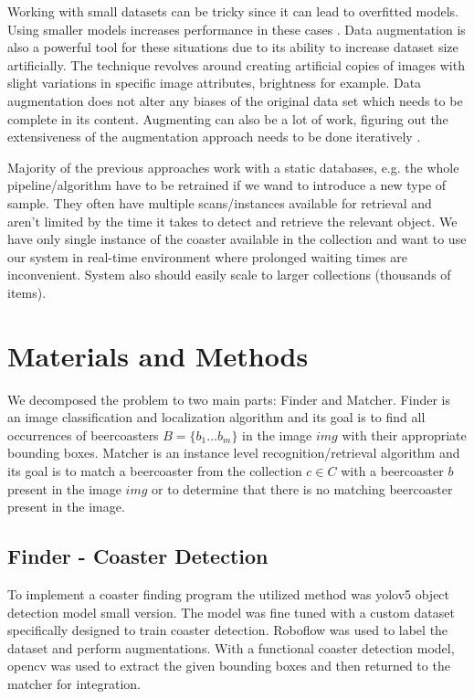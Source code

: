 \documentclass{article}
\begin{document}
Working with small datasets can be tricky since it can lead to overfitted models. Using smaller models increases performance in these cases \cite{augmentation2}. Data augmentation is also a powerful tool for these situations due to its ability to 
increase dataset size artificially. The technique revolves around creating artificial copies of images with slight variations in specific image attributes, brightness for example. Data augmentation does not alter any biases of the original data set which needs to be complete in its content. 
Augmenting can also be a lot of work, figuring out the extensiveness of the augmentation approach needs to be done iteratively \cite{augmentation1}.


Majority of the previous approaches work with a static databases, e.g. the whole pipeline/algorithm have to be retrained if we wand to introduce a new type of sample.
They often have multiple scans/instances available for retrieval and aren't limited by the time it takes to detect and retrieve the relevant object.
We have only single instance of the coaster available in the collection and want to use our system in real-time environment where prolonged waiting times are inconvenient.
System also should easily scale to larger collections (thousands of items).

\section{Materials and Methods}
We decomposed the problem to two main parts: Finder and Matcher.
Finder is an image classification and localization algorithm and its goal is to find all
occurrences of beercoasters $B=\{b_1...b_m\}$ in the image $img$ with their appropriate bounding boxes.
Matcher is an instance level recognition/retrieval algorithm and its goal is to match 
a beercoaster from the collection $c \in C$ with a beercoaster $b$ present in the image $img$
or to determine that there is no matching beercoaster present in the image.

\subsection{Finder - Coaster Detection}

To implement a coaster finding program the utilized method was yolov5 object detection model small version. The model was fine tuned
with a custom dataset specifically designed to train coaster detection. Roboflow was used to label the dataset and perform augmentations.
With a functional coaster detection model, opencv was used to extract the given bounding boxes and then returned to the matcher for 
integration.
\end{document}

